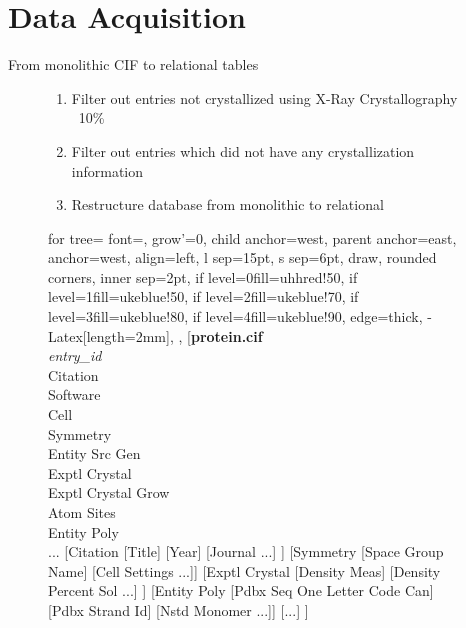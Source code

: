 
\section{Data Acquisition} 

\begin{frame}{From monolithic CIF to relational tables}
	\begin{figure}
		\hspace{-1.4cm}
		\begin{minipage}{.3\textwidth}
			\begin{enumerate}
				\item Filter out entries not crystallized using X-Ray Crystallography ~10\%
				\item Filter out entries which did not have any crystallization information 
				\item Restructure database from monolithic to relational 
			\end{enumerate}
		\end{minipage}%
		\begin{minipage}{.6\textwidth}
			\scriptsize
			\vspace{-0.4cm}
			\hspace{1cm}
			\begin{forest}
				for tree={
					font=\scriptsize,
					grow'=0,
					child anchor=west,
					parent anchor=east,
					anchor=west,
					align=left,
					l sep=15pt,
					s sep=6pt,
					draw,
					rounded corners,
					inner sep=2pt,
					if level=0{fill=uhhred!50}{},
					if level=1{fill=ukeblue!50}{},
					if level=2{fill=ukeblue!70}{},
					if level=3{fill=ukeblue!80}{},
					if level=4{fill=ukeblue!90}{},
					edge={thick, -{Latex[length=2mm]}},
				},
				[\textbf{protein.cif} \\
				\textit{entry\_id} \\
				Citation  \\
				Software \\
				Cell \\
				Symmetry \\
				Entity Src Gen \\
				Exptl Crystal \\
				Exptl Crystal Grow \\ 
				Atom Sites \\
				Entity Poly \\
				...
				[Citation
				[Title]
				[Year]
				[Journal ...]
				]
				[Symmetry
				[Space Group Name]
				[Cell Settings ...]]
				[Exptl Crystal 
				[Density Meas]
				[Density Percent Sol ...]
				]
				[Entity Poly [Pdbx Seq One Letter Code Can] [Pdbx Strand Id] [Nstd Monomer ...]]
				[...]
				]
			\end{forest}		
		\end{minipage}
	\end{figure}
\end{frame}

